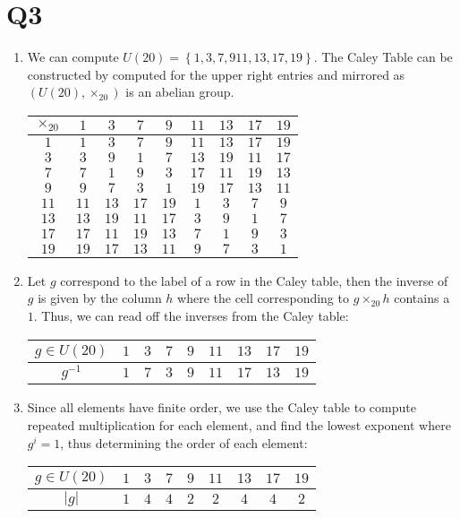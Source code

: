 \documentclass[a4paper, 11pt]{article}
\def\set#1{\left\{ #1 \right\}}
\begin{document}
\section*{Q3}
\begin{enumerate}[label=(\alph*)]
	\item We can compute $U(20)=\set{1, 3, 7, 9 11, 13, 17, 19}$. The Caley Table can be constructed by computed for the upper right entries and mirrored as $(U(20),\times_{20})$ is an abelian group. 
	
	\begin{center}
		\begin{tabular}{c|cccccccc}
			$\times_{20}$ 
			& $ 1$ & $ 3$ & $ 7$ & $ 9$ & $11$ & $13$ & $17$ & $19$ \\
			\midrule
			$1 $ & $ 1$ & $ 3$ & $ 7$ & $ 9$ & $11$ & $13$ & $17$ & $19$ \\
			$3 $ & $ 3$ & $ 9$ & $ 1$ & $ 7$ & $13$ & $19$ & $11$ & $17$ \\
			$7 $ & $ 7$ & $ 1$ & $ 9$ & $ 3$ & $17$ & $11$ & $19$ & $13$ \\
			$9 $ & $ 9$ & $ 7$ & $ 3$ & $ 1$ & $19$ & $17$ & $13$ & $11$ \\
			$11$ & $11$ & $13$ & $17$ & $19$ & $ 1$ & $ 3$ & $ 7$ & $ 9$ \\
			$13$ & $13$ & $19$ & $11$ & $17$ & $ 3$ & $ 9$ & $ 1$ & $ 7$ \\
			$17$ & $17$ & $11$ & $19$ & $13$ & $ 7$ & $ 1$ & $ 9$ & $ 3$ \\
			$19$ & $19$ & $17$ & $13$ & $11$ & $ 9$ & $ 7$ & $ 3$ & $ 1$ \\
		\end{tabular}
	\end{center}
	
	\item Let $g$ correspond to the label of a row in the Caley table, then the inverse of $g$ is given by the column $h$ where the cell corresponding to $g\times_{20}h$ contains a $1$. Thus, we can read off the inverses from the Caley table: 
	\begin{center}
		\begin{tabular}{c|cccccccc}
			$g\in U(20)$ & 
			$ 1$ & $ 3$ & $ 7$ & $ 9$ & $11$ & $13$ & $17$ & $19$ \\
			\midrule
			$g^{-1}$ & 
			$ 1$ & $ 7$ & $ 3$ & $ 9$ & $11$ & $17$ & $13$ & $19$ \\
		\end{tabular}
	\end{center}

	\item Since all elements have finite order, we use the Caley table to compute repeated multiplication for each element, and find the lowest exponent where $g^i=1$, thus determining the order of each element:
	\begin{center}
		\begin{tabular}{c|cccccccc}
			$g\in U(20)$ & 
			$ 1$ & $ 3$ & $ 7$ & $ 9$ & $11$ & $13$ & $17$ & $19$ \\
			\midrule
			$|g|$ & 
			$ 1$ & $4$ & $4$ & $2$ & $2$ & $4$ & $4$ & $2$ \\
		\end{tabular}
	\end{center}


\end{enumerate}
\end{document}

